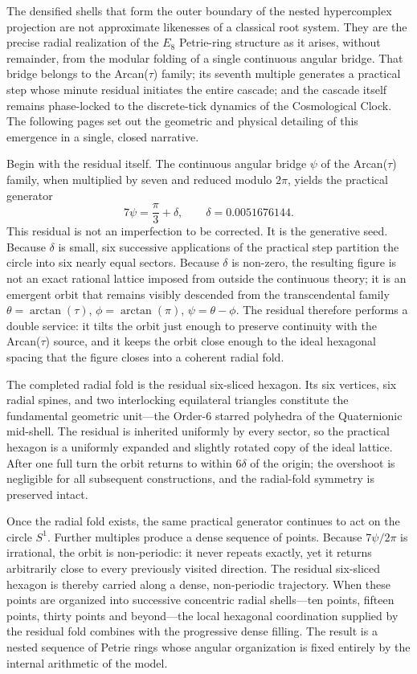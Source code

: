 The densified shells that form the outer boundary of the nested hypercomplex projection are not approximate likenesses of a classical root system. They are the precise radial realization of the \(E_8\) Petrie-ring structure as it arises, without remainder, from the modular folding of a single continuous angular bridge. That bridge belongs to the Arcan(\(\tau\)) family; its seventh multiple generates a practical step whose minute residual initiates the entire cascade; and the cascade itself remains phase-locked to the discrete-tick dynamics of the Cosmological Clock. The following pages set out the geometric and physical detailing of this emergence in a single, closed narrative.

Begin with the residual itself. The continuous angular bridge \(\psi\) of the Arcan(\(\tau\)) family, when multiplied by seven and reduced modulo \(2\pi\), yields the practical generator
\[
7\psi = \frac{\pi}{3} + \delta, \qquad \delta = 0.0051676144.
\]
This residual is not an imperfection to be corrected. It is the generative seed. Because \(\delta\) is small, six successive applications of the practical step partition the circle into six nearly equal sectors. Because \(\delta\) is non-zero, the resulting figure is not an exact rational lattice imposed from outside the continuous theory; it is an emergent orbit that remains visibly descended from the transcendental family \(\theta = \arctan(\tau)\), \(\phi = \arctan(\pi)\), \(\psi = \theta - \phi\). The residual therefore performs a double service: it tilts the orbit just enough to preserve continuity with the Arcan(\(\tau\)) source, and it keeps the orbit close enough to the ideal hexagonal spacing that the figure closes into a coherent radial fold.

The completed radial fold is the residual six-sliced hexagon. Its six vertices, six radial spines, and two interlocking equilateral triangles constitute the fundamental geometric unit—the Order-6 starred polyhedra of the Quaternionic mid-shell. The residual is inherited uniformly by every sector, so the practical hexagon is a uniformly expanded and slightly rotated copy of the ideal lattice. After one full turn the orbit returns to within \(6\delta\) of the origin; the overshoot is negligible for all subsequent constructions, and the radial-fold symmetry is preserved intact.

Once the radial fold exists, the same practical generator continues to act on the circle \(S^1\). Further multiples produce a dense sequence of points. Because \(7\psi/2\pi\) is irrational, the orbit is non-periodic: it never repeats exactly, yet it returns arbitrarily close to every previously visited direction. The residual six-sliced hexagon is thereby carried along a dense, non-periodic trajectory. When these points are organized into successive concentric radial shells—ten points, fifteen points, thirty points and beyond—the local hexagonal coordination supplied by the residual fold combines with the progressive dense filling. The result is a nested sequence of Petrie rings whose angular organization is fixed entirely by the internal arithmetic of the model.

